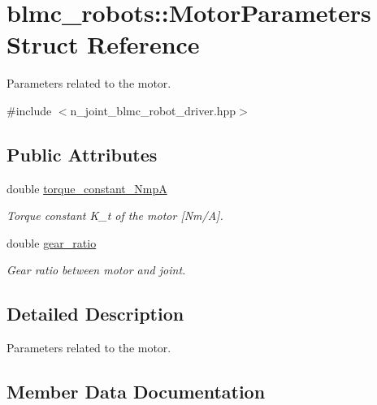 \hypertarget{structblmc__robots_1_1MotorParameters}{}\section{blmc\+\_\+robots\+:\+:Motor\+Parameters Struct Reference}
\label{structblmc__robots_1_1MotorParameters}


Parameters related to the motor.  




{\ttfamily \#include $<$n\+\_\+joint\+\_\+blmc\+\_\+robot\+\_\+driver.\+hpp$>$}

\subsection*{Public Attributes}
\begin{DoxyCompactItemize}
\item 
\mbox{\label{structblmc__robots_1_1MotorParameters_a960e7f64dae8cd08837f8bff620eacfb}} 
double \hyperlink{structblmc__robots_1_1MotorParameters_a960e7f64dae8cd08837f8bff620eacfb}{torque\+\_\+constant\+\_\+\+NmpA}
\begin{DoxyCompactList}\small\item\em Torque constant K\+\_\+t of the motor \mbox{[}Nm/A\mbox{]}. \end{DoxyCompactList}\item 
double \hyperlink{structblmc__robots_1_1MotorParameters_a6a8158b9ac1633bab6181043d04ab655}{gear\+\_\+ratio}
\begin{DoxyCompactList}\small\item\em Gear ratio between motor and joint. \end{DoxyCompactList}\end{DoxyCompactItemize}


\subsection{Detailed Description}
Parameters related to the motor. 

\subsection{Member Data Documentation}
\mbox{\label{structblmc__robots_1_1MotorParameters_a6a8158b9ac1633bab6181043d04ab655}} 
